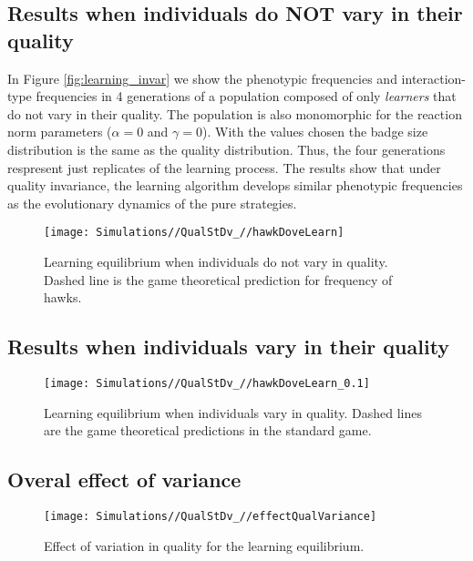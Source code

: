 \documentclass[]{article}
\begin{document}
\subsection{Results when individuals do NOT vary in their
quality}\label{results-when-individuals-do-not-vary-in-their-quality}

In Figure \ref{fig:learning_invar} we show the phenotypic frequencies
and interaction-type frequencies in 4 generations of a population
composed of only \emph{learners} that do not vary in their quality. The
population is also monomorphic for the reaction norm parameters
(\(\alpha=0\) and \(\gamma=0\)). With the values chosen the badge size
distribution is the same as the quality distribution. Thus, the four
generations respresent just replicates of the learning process. The
results show that under quality invariance, the learning algorithm
develops similar phenotypic frequencies as the evolutionary dynamics of
the pure strategies.

\begin{figure}
\texttt{[image: Simulations//QualStDv\_//hawkDoveLearn]} \caption{\label{fig:learning_invar}Learning equilibrium when individuals do not vary in quality. Dashed line is the  game theoretical prediction for frequency of hawks.}\label{fig:fig3}
\end{figure}

\subsection{Results when individuals vary in their
quality}\label{results-when-individuals-vary-in-their-quality}

\begin{figure}
\texttt{[image: Simulations//QualStDv\_//hawkDoveLearn\_0.1]} \caption{\label{fig:learning_var0.1}Learning equilibrium when individuals vary in quality. Dashed lines are the  game theoretical predictions in the standard game.}\label{fig:fig4}
\end{figure}

\subsection{Overal effect of variance}\label{overal-effect-of-variance}

\begin{figure}
\texttt{[image: Simulations//QualStDv\_//effectQualVariance]} \caption{\label{fig:learning_all_var}Effect of variation in quality for the learning equilibrium.}\label{fig:fig5}
\end{figure}
\end{document}
